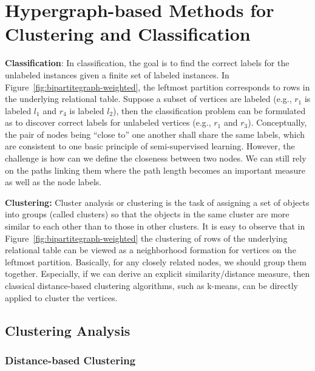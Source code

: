 \section{Hypergraph-based Methods for Clustering and Classification}

\textbf{Classification}:
In classification, the goal is to find the correct labels for the unlabeled instances given a finite set of labeled instances. In Figure~\ref{fig:bipartitegraph-weighted}, the leftmost partition corresponds to rows in the underlying relational table. Suppose a subset of vertices are labeled (e.g., $r_1$ is labeled $l_1$ and $r_4$ is labeled $l_2$), then the classification problem can be formulated as to discover correct labels for unlabeled vertices (e.g., $r_1$ and $r_3$). Conceptually, the pair of nodes being ``close to'' one another shall share the same labels, which are consistent to one basic principle of  semi-supervised learning. However, the challenge is how can we define the closeness between two nodes. We can still rely on the paths linking them where the path length becomes an important measure as well as the node labels.

\textbf{Clustering:}
Cluster analysis or clustering is the task of assigning a set of objects into groups (called clusters) so that the objects in the same cluster are more similar to each other than to those in other clusters. It is easy to observe that in Figure~\ref{fig:bipartitegraph-weighted}  the clustering of rows of the underlying relational table can be viewed as a neighborhood formation for vertices on the leftmost partition. Basically, for any closely related nodes, we should group them together. Especially, if we can derive an explicit  similarity/distance measure, then classical distance-based clustering algorithms, such as k-means, can be directly applied to cluster the vertices.

\subsection{Clustering Analysis}
\subsubsection{Distance-based Clustering}

